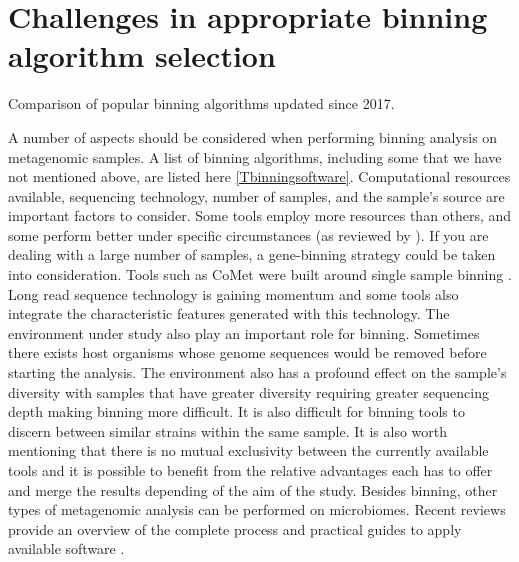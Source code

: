 \documentclass{article}
\begin{document}
\section{Challenges in appropriate binning algorithm selection}
\begin{table}
\begin{tiny}
\centering
\caption[Comparison of popular binning algorithms updated since 2017]{Comparison of popular binning algorithms updated since 2017.}
	
\label{Tbinningsoftware}
\end{tiny}
\end{table}
A number of aspects should be considered when performing binning analysis on metagenomic samples.
A list of binning algorithms, including some that we have not mentioned above, are listed here \autoref{Tbinningsoftware}.
Computational resources available, sequencing technology, number of samples, and the sample's source are important factors to consider.
Some tools employ more resources than others, and some perform better under specific circumstances (as reviewed by ).
If you are dealing with a large number of samples, a gene-binning strategy could be taken into consideration.
Tools such as CoMet were built around single sample binning \cite{herath2017comet}.
Long read sequence technology is gaining momentum and some tools also integrate the characteristic features generated with this technology.
The environment under study also play an important role for binning.
Sometimes there exists host organisms whose genome sequences would be removed before starting the analysis.
The environment also has a profound effect on the sample's diversity with samples that have greater diversity requiring greater sequencing depth making binning more difficult.
It is also difficult for binning tools to discern between similar strains within the same sample.  
It is also worth mentioning that there is no mutual exclusivity between the currently available tools and it is possible to benefit from the relative advantages each has to offer and merge the results depending of the aim of the study.
Besides binning, other types of metagenomic analysis can be performed on microbiomes.
Recent reviews provide an overview of the complete process and practical guides to apply available software \cite{breitwieser2019review}.  
\end{document}
